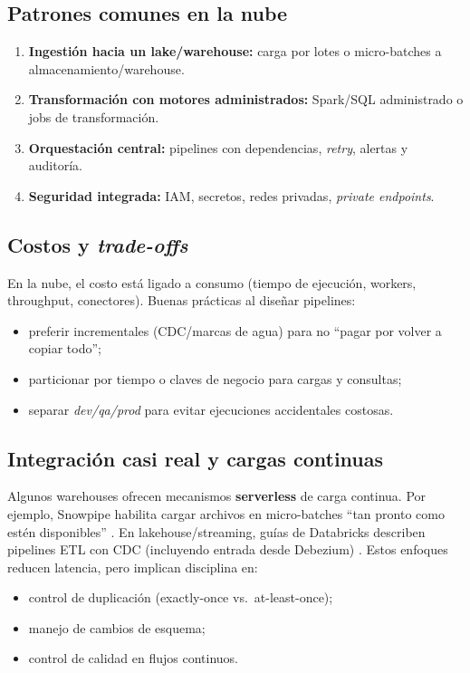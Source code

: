 \documentclass[12pt]{article}
\begin{document}
\subsection{Patrones comunes en la nube}
\begin{enumerate}[label=\textbf{C\arabic*.}, leftmargin=*]
  \item \textbf{Ingestión hacia un lake/warehouse:} carga por lotes o micro-batches a almacenamiento/warehouse.
  \item \textbf{Transformación con motores administrados:} Spark/SQL administrado o jobs de transformación.
  \item \textbf{Orquestación central:} pipelines con dependencias, \textit{retry}, alertas y auditoría.
  \item \textbf{Seguridad integrada:} IAM, secretos, redes privadas, \textit{private endpoints}.
\end{enumerate}

\subsection{Costos y \textit{trade-offs}}
En la nube, el costo está ligado a consumo (tiempo de ejecución, workers, throughput, conectores). Buenas prácticas al diseñar pipelines:
\begin{itemize}[leftmargin=*]
  \item preferir incrementales (CDC/marcas de agua) para no “pagar por volver a copiar todo”;
  \item particionar por tiempo o claves de negocio para cargas y consultas;
  \item separar \textit{dev/qa/prod} para evitar ejecuciones accidentales costosas.
\end{itemize}

\subsection{Integración casi real y cargas continuas}
Algunos warehouses ofrecen mecanismos \textbf{serverless} de carga continua. Por ejemplo, Snowpipe habilita cargar archivos en micro-batches “tan pronto como estén disponibles” \cite{snowpipe_intro}. En lakehouse/streaming, guías de Databricks describen pipelines ETL con CDC (incluyendo entrada desde Debezium) \cite{databricks_cdc_tutorial}. Estos enfoques reducen latencia, pero implican disciplina en:
\begin{itemize}[leftmargin=*]
  \item control de duplicación (exactly-once vs.\ at-least-once);
  \item manejo de cambios de esquema;
  \item control de calidad en flujos continuos.
\end{itemize}
\end{document}
